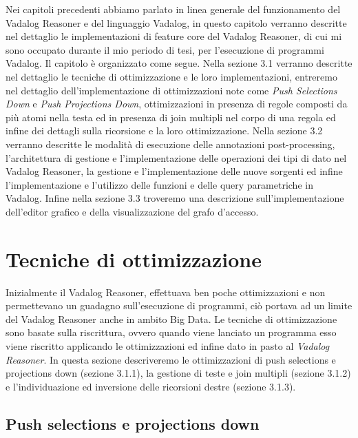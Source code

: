 Nei capitoli precedenti abbiamo parlato in linea generale del funzionamento del Vadalog Reasoner e del linguaggio Vadalog, in questo capitolo verranno descritte nel dettaglio le implementazioni di feature core del Vadalog Reasoner, di cui mi sono occupato durante il mio periodo di tesi, per l'esecuzione di programmi Vadalog. \newline
Il capitolo è organizzato come segue. Nella sezione 3.1 verranno descritte nel dettaglio le tecniche di ottimizzazione e le loro implementazioni, entreremo nel dettaglio dell'implementazione di ottimizzazioni note come \emph{Push Selections Down} e \emph{Push Projections Down}, ottimizzazioni in presenza di regole composti da più atomi nella testa ed in presenza di join multipli nel corpo di una regola ed infine dei dettagli sulla ricorsione e la loro ottimizzazione. \newline
Nella sezione 3.2 verranno descritte le modalità di esecuzione delle annotazioni post-processing, l'architettura di gestione e l'implementazione delle operazioni dei tipi di dato nel Vadalog Reasoner, la gestione e l'implementazione delle nuove sorgenti ed infine l'implementazione e l'utilizzo delle funzioni e delle query parametriche in Vadalog. \newline
Infine nella sezione 3.3 troveremo una descrizione sull'implementazione dell'editor grafico e della visualizzazione del grafo d'accesso.

\section{Tecniche di ottimizzazione}

Inizialmente il Vadalog Reasoner, effettuava ben poche ottimizzazioni e non permettevano un guadagno sull'esecuzione di programmi, ciò portava ad un limite del Vadalog Reasoner anche in ambito Big Data. \newline
Le tecniche di ottimizzazione sono basate sulla riscrittura, ovvero quando viene lanciato un programma esso viene riscritto applicando le ottimizzazioni ed infine dato in pasto al \emph{Vadalog Reasoner}.
In questa sezione descriveremo le ottimizzazioni di push selections e projections down (sezione 3.1.1), la gestione di teste e join multipli (sezione 3.1.2) e l'individuazione ed inversione delle ricorsioni destre (sezione 3.1.3).

\subsection{Push selections e projections down}

